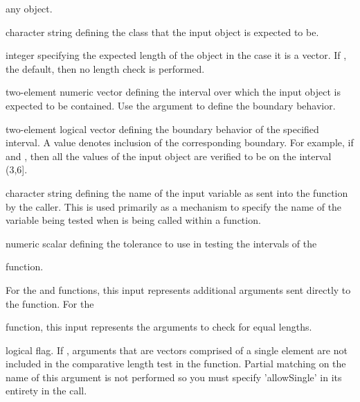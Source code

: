 \begin{Arguments}
\begin{ldescription}
\item[\code{x}] any object.
\item[\code{isType}] character string defining the class that the input object is expected to be.
\item[\code{length}] integer specifying the expected length of the object in the case it is a vector. If , the default,
then no length check is performed.
\item[\code{interval}] two-element numeric vector defining the interval over which the input object is expected to be contained. 
Use the  argument to define the boundary behavior.
\item[\code{inclusion}] two-element logical vector defining the boundary behavior of the specified interval. A  value
denotes inclusion of the corresponding boundary. For example, if  and ,
then all the values of the input object are verified to be on the interval (3,6].
\item[\code{varname}] character string defining the name of the input variable as sent into the function by the caller. 
This is used primarily as a mechanism to specify the name of the variable being tested when  is being called
within a function.
\item[\code{tol}] numeric scalar defining the tolerance to use in testing the intervals of the 

 function.
\item[\code{...}] For the  and  functions, this input represents additional 
arguments sent directly to the  function. For the 

 function, this input
represents the arguments to check for equal lengths.
\item[\code{allowSingle}] logical flag. If , arguments that are vectors comprised of a single element are not included in 
the comparative length test in the  function. Partial matching on the name of this argument is not
performed so you must specify 'allowSingle' in its entirety in the call.
\end{ldescription}
\end{Arguments}
